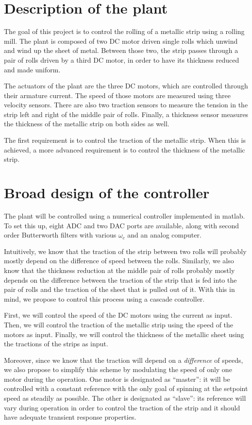 \section{Description of the plant}
The goal of this project is to control the rolling of a metallic strip using a rolling mill. The plant is composed of two DC motor driven single rolls which unwind and wind up the sheet of metal. Between those two, the strip passes through a pair of rolls driven by a third DC motor, in order to have its thickness reduced and made uniform.

The actuators of the plant are the three DC motors, which are controlled through their armature current. The speed of those motors are measured using three velocity sensors. There are also two traction sensors to measure the tension in the strip left and right of the middle pair of rolls. Finally, a thickness sensor measures the thickness of the metallic strip on both sides as well.

The first requirement is to control the traction of the metallic strip. When this is achieved, a more advanced requirement is to control the thickness of the metallic strip.

\section{Broad design of the controller}
The plant will be controlled using a numerical controller implemented in matlab. To set this up, eight ADC and two DAC ports are available, along with second order Butterworth filters with various $\omega_c$ and an analog computer.

Intuitively, we know that the traction of the strip between two rolls will probably mostly depend on the difference of speed between the rolls. Similarly, we also know that the thickness reduction at the middle pair of rolls probably mostly depends on the difference between the traction of the strip that is fed into the pair of rolls and the traction of the sheet that is pulled out of it. With this in mind, we propose to control this process using a cascade controller.

First, we will control the speed of the DC motors using the current as input. Then, we will control the traction of the metallic strip using the speed of the motors as input. Finally, we will control the thickness of the metallic sheet using the tractions of the strips as input.

Moreover, since we know that the traction will depend on a \emph{difference} of speeds, we also propose to simplify this scheme by modulating the speed of only one motor during the operation. One motor is designated as ``master'': it will be controlled with a constant reference with the only goal of spinning at the setpoint speed as steadily as possible. The other is designated as ``slave'': its reference will vary during operation in order to control the traction of the strip and it should have adequate transient response properties.

